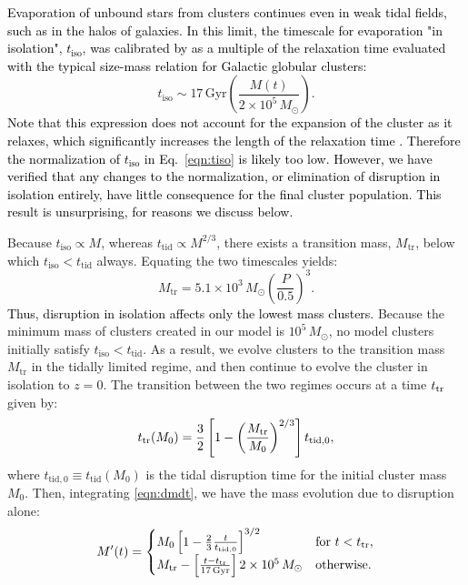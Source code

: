 \documentclass[fleqn,usenatbib]{mnras}
\newcommand{\rev}[1]{\textcolor{black}{#1}}
\newcommand{\Msun}{\,M_{\odot}}
\newcommand{\Miso}{M_{\mathrm{tr}}}
\newcommand{\ttid}{t_{\mathrm{tid}}}
\newcommand{\tiso}{t_{\mathrm{iso}}}
\begin{document}
\rev{Evaporation of unbound stars from clusters continues even in weak tidal fields, such as in the halos of galaxies. In this limit, the timescale for evaporation "in isolation", $\tiso$, was calibrated by \citet{gnedin_etal14} as a multiple of the relaxation time evaluated with the typical size-mass relation for Galactic globular clusters:}
\begin{equation}
  \tiso \sim 17\,\mathrm{Gyr}\left(\frac{M(t)}{2 \times 10^{5}\Msun}\right).
	\label{eqn:tiso}
\end{equation}
\rev{Note that this expression does not account for the expansion of the cluster as it relaxes, which significantly increases the length of the relaxation time \citep[e.g.,][]{baumgardt_etal02}.  Therefore the normalization of $\tiso$ in Eq.~\ref{eqn:tiso} is likely too low. However, we have verified that any changes to the normalization, or elimination of disruption in isolation entirely, have little consequence for the final cluster population. This result is unsurprising, for reasons we discuss below.}

Because $\tiso \propto M$, whereas $\ttid \propto M^{2/3}$, there exists a transition mass, $\Miso$, below which $\tiso < \ttid$ always. Equating the two timescales yields:
\begin{equation}
  \Miso = 5.1 \times 10^{3}\Msun \left(\frac{P}{0.5}\right)^3.
\end{equation}
\rev{Thus, disruption in isolation affects only the lowest mass clusters.} Because the minimum mass of clusters created in our model is $10^5\Msun$, no model clusters initially satisfy $\tiso < \ttid$. As a result, we evolve clusters to the transition mass $\Miso$ in the tidally limited regime, and then continue to evolve the cluster in isolation to $z=0$. The transition between the two regimes occurs at a time $t_{\rm tr}$ given by:
\begin{equation}
  t_{\rm tr}(M_0) = \frac{3}{2}\left[1 - \left(\frac{\Miso}{M_0}\right)^{2/3}\right]t_{\mathrm{tid, 0}}, 
\end{equation}
where $t_{\mathrm{tid,0}} \equiv \ttid(M_0)$ is the tidal disruption time for the initial cluster mass $M_0$. Then, integrating \autoref{eqn:dmdt}, we have the mass evolution due to disruption alone: 
\begin{equation}
  M'(t) = \begin{cases} M_0\left[ 1 - \frac{2}{3}\frac{t}{t_{\mathrm{tid,0}}} \right]^{3/2} &\text{for}\ t < t_{\rm tr},\\ 
  \Miso - \left[ \frac{ t - t_{\rm tr}}{17\,\mathrm{Gyr}} \right] 2 \times 10^5\Msun &\text{otherwise.}  
\end{cases}
\end{equation}
\end{document}
